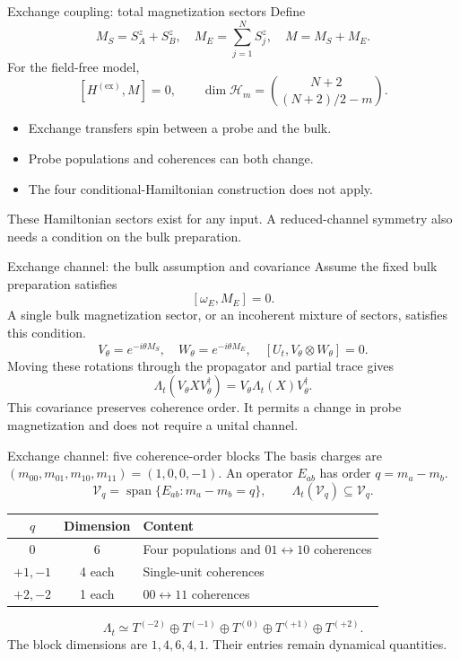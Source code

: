 \documentclass[aspectratio=169,11pt]{beamer}
\newcommand{\ex}{\mathrm{ex}}
\begin{document}
\begin{frame}{Exchange coupling: total magnetization sectors}
Define
\[
M_S=S_A^z+S_B^z,\quad M_E=\sum_{j=1}^NS_j^z,\quad M=M_S+M_E.
\]
For the field-free model,
\[
[H^{(\ex)},M]=0,\qquad
\dim\mathcal H_m=\binom{N+2}{(N+2)/2-m}.
\]
\begin{itemize}\setlength\itemsep{9pt}
\item Exchange transfers spin between a probe and the bulk.
\item Probe populations and coherences can both change.
\item The four conditional-Hamiltonian construction does not apply.
\end{itemize}
\medskip
These Hamiltonian sectors exist for any input. A reduced-channel
symmetry also needs a condition on the bulk preparation.
\end{frame}

\begin{frame}{Exchange channel: the bulk assumption and covariance}
Assume the fixed bulk preparation satisfies
\[
\boxed{[\omega_E,M_E]=0.}
\]
A single bulk magnetization sector, or an incoherent mixture of sectors,
satisfies this condition.
\[
V_\theta=e^{-i\theta M_S},\quad W_\theta=e^{-i\theta M_E},
\quad [U_t,V_\theta\otimes W_\theta]=0.
\]
Moving these rotations through the propagator and partial trace gives
\[
\boxed{\Lambda_t(V_\theta XV_\theta^\dagger)
=V_\theta\Lambda_t(X)V_\theta^\dagger.}
\]
This covariance preserves coherence order. It permits a change in
probe magnetization and does not require a unital channel.
\end{frame}

\begin{frame}{Exchange channel: five coherence-order blocks}
The basis charges are $(m_{00},m_{01},m_{10},m_{11})=(1,0,0,-1)$.
An operator $E_{ab}$ has order $q=m_a-m_b$.
\[
\mathcal V_q=\operatorname{span}\{E_{ab}:m_a-m_b=q\},\qquad
\Lambda_t(\mathcal V_q)\subseteq\mathcal V_q.
\]
\begin{center}
\begin{tabular}{@{}ccl@{}}
\toprule
$q$&Dimension&Content\\\midrule
$0$&6&Four populations and $01\leftrightarrow10$ coherences\\
$+1,-1$&4 each&Single-unit coherences\\
$+2,-2$&1 each&$00\leftrightarrow11$ coherences\\\bottomrule
\end{tabular}
\end{center}
\[
\boxed{\Lambda_t\simeq T^{(-2)}\oplus T^{(-1)}\oplus T^{(0)}
\oplus T^{(+1)}\oplus T^{(+2)}.}
\]
The block dimensions are $1,4,6,4,1$. Their entries remain dynamical quantities.
\end{frame}
\end{document}
